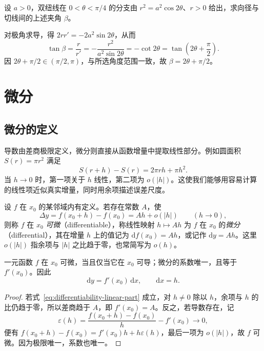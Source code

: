 \begin{example}
\label{ex:lemniscate-radius-tangent-angle}
设 $a>0$，双纽线在 $0<\theta<\pi/4$ 的分支由 $r^2=a^2\cos2\theta$、$r>0$ 给出，求向径与切线间的上述夹角 $\beta$。
\end{example}
\begin{solve}
对极角求导，得 $2rr'=-2a^2\sin2\theta$，从而
\[
    \tan\beta=\frac r{r'}
    =-\frac{r^2}{a^2\sin2\theta}
    =-\cot2\theta
    =\tan\left(2\theta+\frac\pi2\right).
\]
因 $2\theta+\pi/2\in(\pi/2,\pi)$，与所选角度范围一致，故 $\beta=2\theta+\pi/2$。
\end{solve}

\section{微分}
\label{sec:differentials}

\subsection{微分的定义}
\label{subsec:definition-of-differentials}

导数由差商极限定义，微分则直接从函数增量中提取线性部分。例如圆面积 $S(r)=\pi r^2$ 满足
\[
    S(r+h)-S(r)=2\pi rh+\pi h^2.
\]
当 $h\to0$ 时，第一项关于 $h$ 线性，第二项为 $o(|h|)$。这使我们能够用容易计算的线性项近似真实增量，同时用余项描述误差尺度。

\begin{definition}
\label{def:one-variable-differential}
设 $f$ 在 $x_0$ 的某邻域内有定义。若存在常数 $A$，使
\begin{equation}
\label{eq:differentiability-linear-part}
    \Delta y=f(x_0+h)-f(x_0)=Ah+o(|h|)\qquad(h\to0),
\end{equation}
则称 $f$ 在 $x_0$ \emph{可微}（differentiable），称线性映射 $h\mapsto Ah$ 为 $f$ 在 $x_0$ 的\emph{微分}（differential），其在增量 $h$ 上的值记为 $\mathrm df(x_0)=Ah$，或记作 $\mathrm dy=Ah$。这里 $o(|h|)$ 指余项与 $|h|$ 之比趋于零，也常简写为 $o(h)$。
\end{definition}

\begin{theorem}
\label{thm:one-variable-differentiable-iff-derivable}
一元函数 $f$ 在 $x_0$ 可微，当且仅当它在 $x_0$ 可导；微分的系数唯一，且等于 $f'(x_0)$。因此
\begin{equation}
\label{eq:one-variable-differential}
    \mathrm dy=f'(x_0)\,\mathrm dx,\qquad \mathrm dx=h.
\end{equation}
\end{theorem}
\begin{proof}
若式~\eqref{eq:differentiability-linear-part} 成立，对 $h\ne0$ 除以 $h$，余项与 $h$ 的比仍趋于零，所以差商趋于 $A$，即 $f'(x_0)=A$。反之，若导数存在，记
\[
    \varepsilon(h)=\frac{f(x_0+h)-f(x_0)}h-f'(x_0)\longrightarrow0,
\]
便有 $f(x_0+h)-f(x_0)=f'(x_0)h+h\varepsilon(h)$，最后一项为 $o(|h|)$，故 $f$ 可微。因为极限唯一，系数也唯一。
\end{proof}

